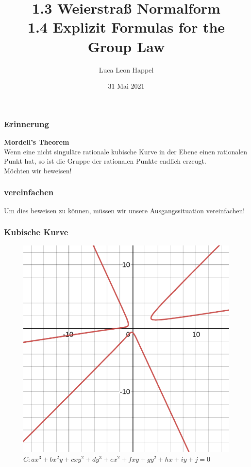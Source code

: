 \documentclass{beamer}
\title{1.3 Weierstraß Normalform\\1.4 Explizit Formulas for the Group Law}
\author{Luca Leon Happel}
\date{31 Mai 2021}
\begin{document}

\frame{\titlepage}

\begin{frame}
\frametitle{Erinnerung}
	\textbf{Mordell's Theorem}\\
	Wenn eine nicht singuläre rationale kubische Kurve in der
	Ebene einen rationalen Punkt hat, so ist die Gruppe der
	rationalen Punkte endlich erzeugt.\\
	Möchten wir beweisen!
\end{frame}

\begin{frame}
\frametitle{vereinfachen}
	Um dies beweisen zu können, müssen wir unsere
	Ausgangssituation vereinfachen!
\end{frame}

\begin{frame}
\frametitle{Kubische Kurve}
    \begin{figure}
		\caption{$C:ax^3+bx^2y+cxy^2+dy^3+ex^2+fxy+gy^2+hx+iy+j=0$}
		\includegraphics[scale=0.3]{images/desmos-graph01.png}
    \end{figure}
\end{frame}
\end{document}
